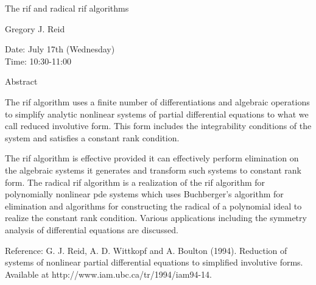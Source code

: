 \begin{center}
\LARGE
The rif and radical rif algorithms
\end{center}

\begin{center}
\Large
Gregory J. Reid
\end{center}

\noindent
Date:  July 17th (Wednesday)\\
Time:  10:30-11:00\\

\begin{center}
\large
Abstract
\end{center}

The rif algorithm uses a finite number of differentiations and algebraic operations to simplify
analytic nonlinear systems of partial differential equations to what we call reduced involutive
form. This form includes the integrability conditions of the system and satisfies a constant rank
condition. 

The rif algorithm is effective provided it can effectively perform elimination on the algebraic
systems it generates and transform such systems to constant rank form. The radical rif algorithm is
a realization of the rif algorithm for polynomially nonlinear pde systems which uses Buchberger's
algorithm for elimination and algorithms for constructing the radical of a polynomial ideal to
realize the constant rank condition. Various applications including the symmetry analysis of
differential equations are discussed. 

Reference:
G. J. Reid, A. D. Wittkopf and A. Boulton (1994).
Reduction of systems of nonlinear partial differential equations to simplified involutive forms. \\
Available at http://www.iam.ubc.ca/tr/1994/iam94-14. 

